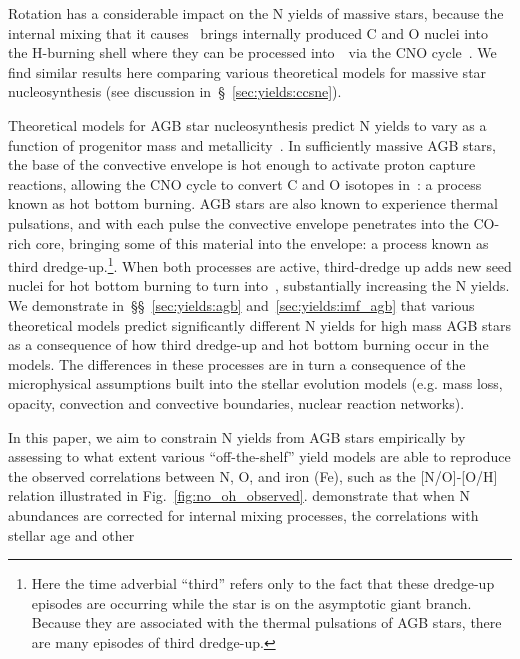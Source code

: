 \documentclass[ms.tex]{subfiles}
\begin{document}
Rotation has a considerable impact on the N yields of massive stars, because the
internal mixing that it causes~\citep{Zahn1992, Maeder1998, Lagarde2012} brings
internally produced C and O nuclei into the H-burning shell where they can be
processed into~\Nfourteen~via the CNO cycle~\citep{Heger2010, Frischknecht2016,
Andrews2017}.
We find similar results here comparing various theoretical models for
massive star nucleosynthesis (see discussion in~\S~\ref{sec:yields:ccsne}).
\par
Theoretical models for AGB star nucleosynthesis predict N yields to vary as a
function of progenitor mass and metallicity~\citep{Cristallo2011, Cristallo2015,
Karakas2010, Karakas2016, Karakas2018, Ventura2013, Ventura2014, Ventura2018,
Ventura2020}.
In sufficiently massive AGB stars, the base of the convective envelope is hot
enough to activate proton capture reactions, allowing the CNO cycle to convert
C and O isotopes in~\Nfourteen: a process known as hot bottom burning.
AGB stars are also known to experience thermal pulsations, and with each pulse
the convective envelope penetrates into the CO-rich core, bringing some of this
material into the envelope: a process known as third dredge-up.\footnote{
	Here the time adverbial ``third'' refers only to the fact that these
	dredge-up episodes are occurring while the star is on the asymptotic giant
	branch. Because they are associated with the thermal pulsations of AGB
	stars, there are many episodes of third dredge-up.
}.
When both processes are active, third-dredge up adds new seed nuclei for hot
bottom burning to turn into~\Nfourteen, substantially increasing the N yields.
We demonstrate in~\S\S~\ref{sec:yields:agb} and~\ref{sec:yields:imf_agb} that
various theoretical models predict significantly different N yields for high
mass AGB stars as a consequence of how third dredge-up and hot bottom burning
occur in the models.
The differences in these processes are in turn a consequence of the
microphysical assumptions built into the stellar evolution models (e.g. mass
loss, opacity, convection and convective boundaries, nuclear reaction networks).
\par
In this paper, we aim to constrain N yields from AGB stars empirically by
assessing to what extent various ``off-the-shelf'' yield models are able to
reproduce the observed correlations between N, O, and iron (Fe), such as the
[N/O]-[O/H] relation illustrated in Fig.~\ref{fig:no_oh_observed}.
\citet{Vincenzo2021} demonstrate that when N abundances are corrected for
internal mixing processes, the correlations with stellar age and other
\end{document}
